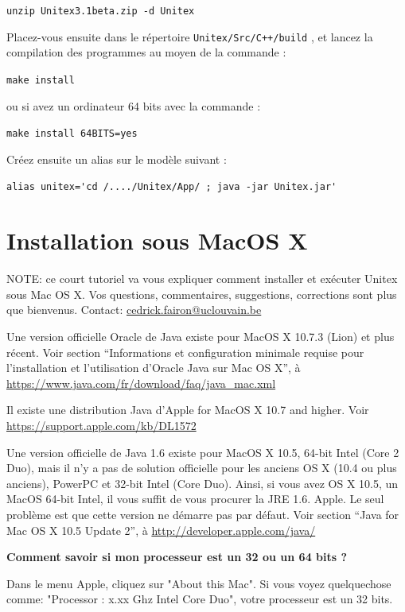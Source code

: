 \bigskip \noindent \verb$unzip Unitex3.1beta.zip -d Unitex$

\bigskip
\noindent Placez-vous ensuite dans le répertoire \verb|Unitex/Src/C++/build|                                     , et lancez la compilation des
programmes au moyen de la commande :


\bigskip \verb+make install+

\bigskip
\noindent ou si avez un ordinateur 64 bits avec la commande :
 
\bigskip \verb+make install 64BITS=yes+

\bigskip
\noindent Créez ensuite un alias sur le modèle suivant :

\bigskip \verb$alias unitex='cd /..../Unitex/App/ ; java -jar Unitex.jar'$


\section{Installation sous MacOS X}
\label{section-macos-install}
\noindent NOTE: ce court tutoriel va vous expliquer comment installer et exécuter Unitex sous Mac OS
X. Vos questions, commentaires, suggestions,
corrections sont plus que bienvenus.
\noindent Contact: \url{cedrick.fairon@uclouvain.be}


\bigskip
\noindent Une version officielle Oracle de Java existe pour MacOS X 10.7.3 (Lion) et plus récent.
	Voir section ``Informations et configuration minimale requise pour l'installation et l'utilisation d'Oracle Java sur Mac OS X'', à \url{https://www.java.com/fr/download/faq/java_mac.xml}

	

\bigskip
\noindent Il existe une distribution  Java d'Apple for MacOS X 10.7 and higher.
	Voir \url{https://support.apple.com/kb/DL1572}


\bigskip
\noindent Une version officielle de Java 1.6 existe pour MacOS X 10.5, 64-bit Intel 
(Core 2 Duo), mais il n'y a pas de solution officielle pour les anciens OS X (10.4 ou plus anciens),
PowerPC et 32-bit Intel (Core Duo). Ainsi,
 si vous avez OS X 10.5, un MacOS 64-bit Intel, il vous suffit de vous procurer
	la JRE 1.6. Apple. Le seul problème est que cette version ne démarre pas par défaut.
	Voir section ``Java for Mac OS X 10.5 Update 2'', à \url{http://developer.apple.com/java/}


\noindent\textbf{Comment savoir si mon processeur est un 32 ou un 64 bits ?}

\noindent Dans le menu Apple, cliquez sur "About this Mac". Si vous voyez quelquechose comme:
"Processor : x.xx Ghz Intel Core Duo", votre processeur est un 32 bits.

